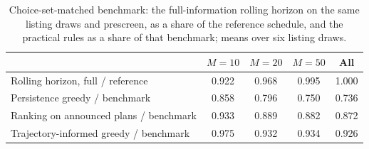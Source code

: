 \begin{table}[H]
\centering
\caption{Choice-set-matched benchmark: the full-information rolling horizon on the same listing draws and prescreen, as a share of the reference schedule, and the practical rules as a share of that benchmark; means over six listing draws.}
\label{tab:E3}
\footnotesize
\begin{tabular}{@{}lcccc@{}}
\toprule
 & $M = 10$ & $M = 20$ & $M = 50$ & All \\
\midrule
Rolling horizon, full / reference & 0.922 & 0.968 & 0.995 & 1.000 \\
Persistence greedy / benchmark & 0.858 & 0.796 & 0.750 & 0.736 \\
Ranking on announced plans / benchmark & 0.933 & 0.889 & 0.882 & 0.872 \\
Trajectory-informed greedy / benchmark & 0.975 & 0.932 & 0.934 & 0.926 \\
\bottomrule
\end{tabular}
\end{table}
